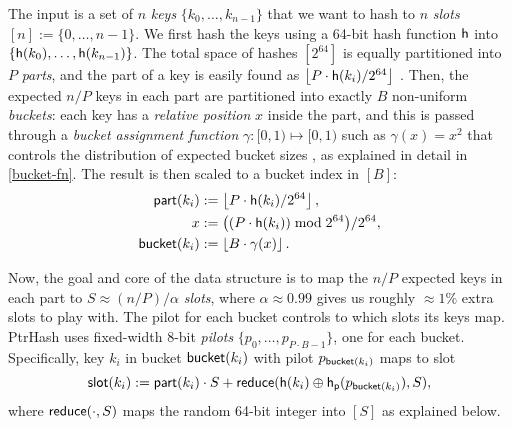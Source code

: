 \documentclass[a4paper,UKenglish,cleveref,thm-restate]{lipics-v2021}
\begin{document}
The input is a set of \(n\) \emph{keys} \(\{k_0, \dots, k_{n-1}\}\) that we want to hash to
\(n\) \emph{slots} \([n]:=\{0, \dots, n-1\}\).
We first hash the keys using a 64-bit hash function \(\mathsf{h}\) into
\(\{\mathsf{h}(k_0), \dots, \mathsf{h}(k_{n-1})\}\). The total space of hashes \([2^{64}]\)
is equally partitioned into \(P\) \emph{parts}, and the part of a key is easily found
as \(\left\lfloor P\cdot \mathsf{h}(k_i) / 2^{64}\right\rfloor\) \cite{fast-range}.
Then, the expected \(n/P\) keys in each part are partitioned into exactly \(B\) non-uniform \emph{buckets}:
each key has a \emph{relative position} \(x\) inside the part, and this is passed through
a \emph{bucket
assignment function} \(\gamma: [0,1)\mapsto[0,1)\) such as \(\gamma(x)=x^2\)
that controls the distribution of expected bucket
sizes \cite{phobic}, as explained in detail in \cref{bucket-fn}.
The result is then scaled to a bucket index in \([B]\):
\begin{align}
\begin{split}
  \mathsf{part}(k_i) &:= \left\lfloor P\cdot \mathsf{h}(k_i) / 2^{64}\right\rfloor,\\
  x &:= \big((P\cdot \mathsf{h}(k_i)) \bmod 2^{64}\big)/2^{64},\\
  \mathsf{bucket}(k_i) &:= \left\lfloor B\cdot \gamma(x)\right\rfloor.
\end{split}\label{eq:partbucket}
\end{align}
\vspace{-2em}

Now, the goal and core of the data structure is to map the \(n/P\) expected keys in each part to \(S\approx
(n/P)/\alpha\) \emph{slots}, where \(\alpha\approx 0.99\) gives us roughly \(\approx 1\%\) extra slots to
play with. The pilot for each bucket controls to which slots its keys map.
PtrHash uses fixed-width $8$-bit \emph{pilots} \(\{p_0, \dots,
p_{P\cdot B-1}\}\), one for each bucket. Specifically, key \(k_i\) in bucket \(\mathsf{bucket}(k_i)\) with pilot \(p_{\mathsf{bucket}(k_i)}\)
maps to slot
\begin{equation}
  \mathsf{slot}(k_i) := \mathsf{part}(k_i) \cdot S + \mathsf{reduce}(\mathsf{h}(k_i) \oplus \mathsf{h}_{\mathsf{p}}(p_{\mathsf{bucket}(k_i)}), S),\label{eq:slot}
\end{equation}
where \(\mathsf{reduce}(\cdot, S)\) maps the random 64-bit integer into \([S]\) as explained below.
\end{document}
